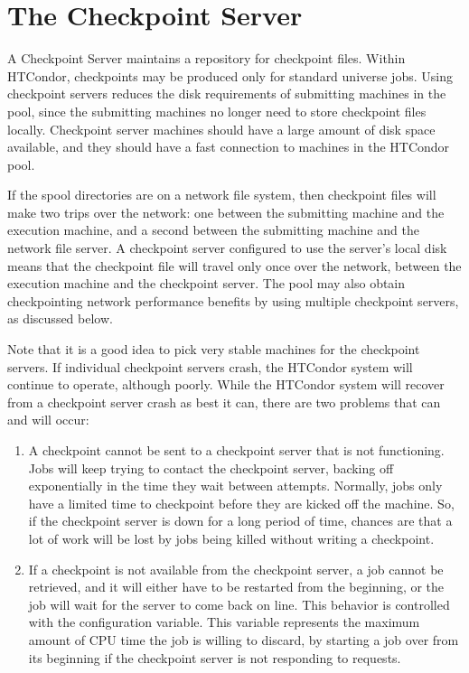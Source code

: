 \section{The Checkpoint Server}\label{sec:Ckpt-Server}

A Checkpoint Server maintains a repository for checkpoint files.
Within HTCondor, checkpoints may be produced only for standard universe jobs.
Using checkpoint servers reduces the disk requirements of submitting
machines in the pool, since the submitting machines no longer need to
store checkpoint files locally.
Checkpoint server machines should have a large amount of disk space
available, and they should have a fast connection to machines
in the HTCondor pool.

If the spool directories are on a network file system, then
checkpoint files will make two trips over the network: one between the
submitting machine and the execution machine, and a second between the
submitting machine and the network file server.
A checkpoint server configured to use the server's local disk
means that the checkpoint file will travel only once over the
network, between the execution machine and the checkpoint server.
The pool may also obtain checkpointing network performance benefits by
using multiple checkpoint servers, as discussed below.

Note that it is a good idea to pick very stable machines for the checkpoint
servers.
If individual checkpoint servers crash, the HTCondor system will continue to
operate, although poorly.  
While the HTCondor system will recover from a checkpoint server crash
as best it can, there are two problems that can and will occur:
\begin{enumerate}

\item A checkpoint cannot be sent to a checkpoint server that
is not functioning.
Jobs will keep trying to contact the checkpoint server, backing
off exponentially in the time they wait between attempts.
Normally, jobs only have a limited time to checkpoint before they are
kicked off the machine.
So, if the checkpoint server is down for a long period of time,
chances are that a lot of work will be lost by jobs being killed 
without writing a checkpoint. 

\item If a checkpoint is not available from the checkpoint server,
a job cannot be retrieved, and it will either have to be restarted from
the beginning, or the job will wait for the server to come back on line.
This behavior is controlled with the
 configuration variable.
This variable represents the maximum amount of CPU time the job is
willing to discard, by starting a job over from its beginning if the
checkpoint server is not responding to requests.

\end{enumerate}

